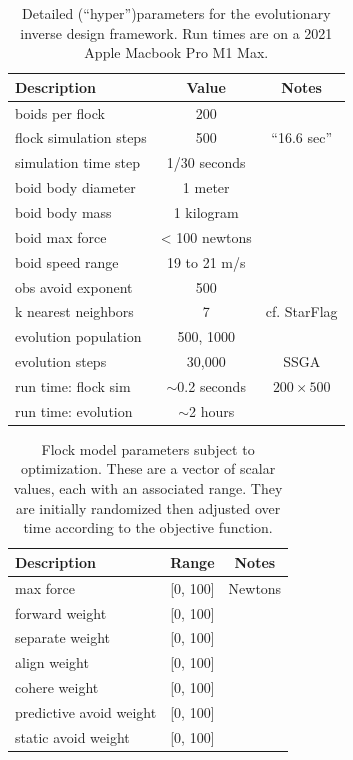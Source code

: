 \documentclass[letterpaper]{article}
\begin{document}


\begin{table}[b]
\centering
\begin{tabular}{ | l | c | c | }
    \hline
    \textbf{Description} & \textbf{Value} & \textbf{Notes} \\
    \hline
    boids per flock & 200 &  \\
    flock simulation steps & 500 & ``16.6 sec'' \\
    simulation time step & 1/30 seconds & \\
    \hline
    boid body diameter & 1 meter & \\
    boid body mass & 1 kilogram & \\
    boid max force & < 100 newtons & \\
    boid speed range & 19 to 21 m/s & \\
    obs avoid exponent & 500 & \\
    k nearest neighbors & 7 & cf. StarFlag \\
    \hline
    evolution population & 500, 1000 & \\
    evolution steps & 30,000 & SSGA \\
    \hline
    run time: flock sim & $\sim$0.2 seconds & $200{\times}500$ \\
    run time: evolution & $\sim$2 hours & \\
    \hline
\end{tabular}
\caption{Detailed (``hyper'')parameters for the evolutionary inverse design framework. Run times are on a 2021 Apple Macbook Pro M1 Max.}
\label{table:HyperParameters}
\end{table}

\begin{table}[b]
\centering
\begin{tabular}{ | l | c | c | }
    \hline
    \textbf{Description} & \textbf{Range} & \textbf{Notes} \\
    \hline
    max force & [0, 100] & Newtons \\
    forward weight & [0, 100] &  \\
    separate weight & [0, 100] &  \\
    align weight & [0, 100] &  \\
    cohere weight & [0, 100] &  \\
    predictive avoid weight & [0, 100] &  \\
    static avoid weight & [0, 100] &  \\
    \hline
\end{tabular}
\caption{Flock model parameters subject to optimization. These are a vector of scalar values, each with an associated range. They are initially randomized then adjusted over time according to the objective function.}
\label{table:flock-parameters}
\end{table}
\end{document}
